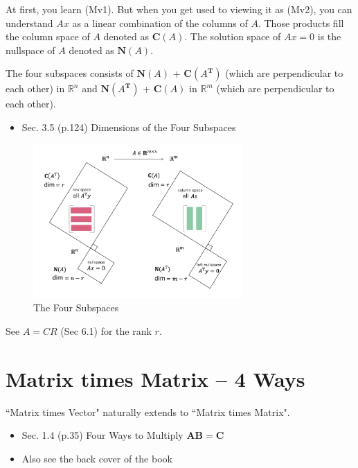 \documentclass[letterpaper]{article}
\begin{document}
At first, you learn (Mv1). But when you get used to viewing it as (Mv2),
you can understand $Ax$ as a linear combination of the columns of $A$.
Those products fill the column space of $A$  denoted as $\mathbf{C}(A)$.
The solution space of $Ax=0$ is the nullspace of $A$ denoted as $\mathbf{N}(A)$.

The four subspaces consists of $\mathbf{N}(A)$ + $\mathbf{C}(A^\mathbf{T})$ 
(which are perpendicular to each other) in $\mathbb{R}^n$ and
$\mathbf{N}(A^\mathbf{T})$ + $\mathbf{C}(A)$ in $\mathbb{R}^m$
(which are perpendicular to each other).

\begin{itemize}
  \item Sec. 3.5 (p.124) Dimensions of the Four Subspaces
\end{itemize} 

\begin{figure}[H]
  \centering
  \includegraphics[keepaspectratio, width=8cm]{4-Subspaces.png}
  \caption{The Four Subspaces}
\end{figure}

See $A=CR$ (Sec 6.1) for the rank $r$.


\clearpage

\section{Matrix times Matrix -- 4 Ways}

``Matrix times Vector" naturally extends to ``Matrix times Matrix".

\begin{itemize}
  \item Sec. 1.4 (p.35) Four Ways to Multiply $\bm{AB=C}$
  \item Also see the back cover of the book
\end{itemize} 
\end{document}
